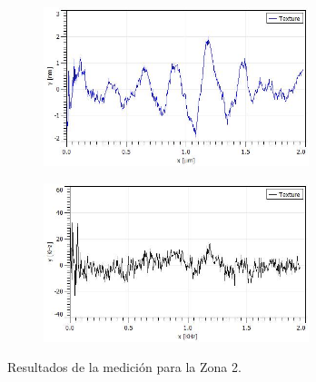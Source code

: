 \begin{figure}[H]
    \begin{subfigure}[b]{0.45\textwidth}
        \includegraphics[width = 0.85\textwidth]{figures/chap4/cdte-ag/afm-nsom-results/2um/CdTe_Ag_afm_profile.jpg}
    \end{subfigure}\hfill
    \begin{subfigure}[b]{0.45\textwidth}
        \includegraphics[width = 0.85\textwidth]{figures/chap4/cdte-ag/afm-nsom-results/2um/CdTe_Ag_nsom_profile.jpg}
    \end{subfigure}
\caption{Resultados de la medición para la Zona 2.}
\label{fig:afm-nsom-results-2um}
\end{figure}

